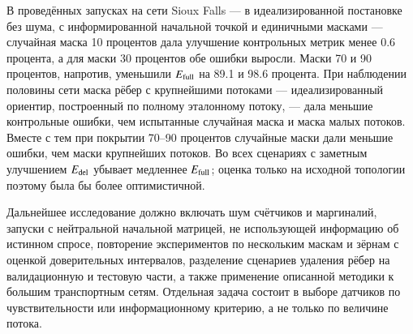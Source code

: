 \documentclass{crm-article}
\begin{document}
В проведённых запусках на сети Sioux Falls --- в идеализированной
постановке без шума, с информированной начальной точкой и единичными
масками --- случайная маска 10 процентов дала улучшение
контрольных метрик менее 0.6 процента, а для маски 30 процентов обе ошибки
выросли. Маски 70 и 90 процентов, напротив, уменьшили $E_{\rm full}$ на 89.1
и 98.6 процента. При наблюдении половины сети маска рёбер с крупнейшими потоками ---
идеализированный ориентир, построенный по полному эталонному потоку, --- дала
меньшие контрольные ошибки, чем испытанные случайная маска и маска малых
потоков. Вместе с тем
при покрытии 70--90 процентов случайные маски дали меньшие ошибки, чем
маски крупнейших потоков. Во всех сценариях с заметным улучшением
$E_{\rm del}$ убывает
медленнее $E_{\rm full}$; оценка только на исходной топологии поэтому была бы
более оптимистичной.

Дальнейшее исследование должно включать шум счётчиков и маргиналий, запуски
с нейтральной начальной матрицей, не использующей информацию об истинном
спросе, повторение экспериментов по нескольким маскам и зёрнам с оценкой
доверительных интервалов, разделение сценариев удаления рёбер на
валидационную и тестовую части, а также применение описанной методики к большим транспортным сетям. Отдельная
задача состоит в выборе датчиков по чувствительности или информационному
критерию, а не только по величине потока.
\end{document}
